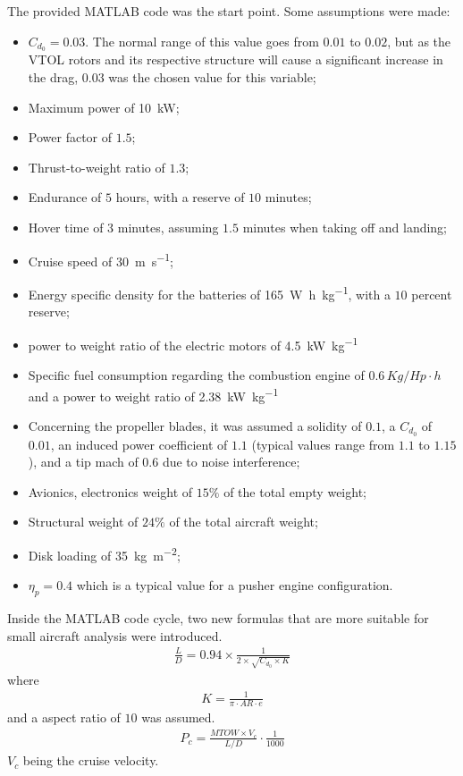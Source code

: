 \documentclass[english,fira]{ist-report}
\begin{document}
The provided MATLAB code was the start point. Some assumptions were made: 
\begin{itemize}
    \item $C_{d_0} = 0.03$. The normal range of this value goes from $0.01$ to $0.02$, but as the VTOL rotors and its respective structure will cause a significant increase in the drag, $0.03$ was the chosen value for this variable;
    \item Maximum power of \SI{10}{\kilo\watt};
    \item Power factor of $1.5$;
    \item Thrust-to-weight ratio of $1.3$;
    \item Endurance of $5$ hours, with a reserve of $10$ minutes;
    \item Hover time of $3$ minutes, assuming $1.5$ minutes when taking off and landing;
    \item Cruise speed of \SI{30}{\meter\per\second};
    \item Energy specific density for the batteries of \SI{165}{\watt\hour\per\kilogram}, with a $10$ percent reserve;
    \item power to weight ratio of the electric motors of \SI{4.5}{\kilo\watt\per\kilogram}
    \item Specific fuel consumption regarding the combustion engine of $0.6\,Kg/Hp\cdot h$ and a power to weight ratio of \SI{2.38}{\kilo\watt\per\kilogram}
    \item Concerning the propeller blades, it was assumed a solidity of $0.1$, a $C_{d_0}$ of $0.01$, an induced power coefficient of $1.1$ (typical values range from $1.1$ to $1.15$), and a tip mach of $0.6$ due to noise interference;
    \item Avionics, electronics weight of $15\%$ of the total empty weight;
    \item Structural weight of $24\%$ of the total aircraft weight;
    \item Disk loading of \SI{35}{\kilogram\per\meter\squared};
    \item $\eta_p=0.4$ which is a typical value for a pusher engine configuration.
\end{itemize}
 
Inside the MATLAB code cycle, two new formulas that are more suitable for small aircraft analysis were introduced.
\begin{gather*}
    \frac{L}{D}=0.94\times \frac{1}{2\times \sqrt{C_{d_0} \times K}}
\end{gather*}
where
\begin{gather*}
    K=\frac{1}{\pi\cdot AR\cdot e}
\end{gather*}
and a aspect ratio of $10$ was assumed.
\begin{gather*}
    P_c=\frac{MTOW \times V_c}{L/D}\cdot\frac{1}{1000}
\end{gather*}
$V_c$ being the cruise velocity. 
\end{document}
